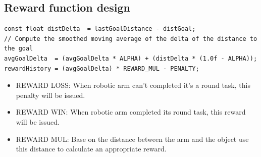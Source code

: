 \documentclass[10pt,journal,compsoc]{IEEEtran}
\begin{document}
\subsection{Reward function design}

\begin{lstlisting}
const float distDelta  = lastGoalDistance - distGoal;
// Compute the smoothed moving average of the delta of the distance to the goal
avgGoalDelta  = (avgGoalDelta * ALPHA) + (distDelta * (1.0f - ALPHA));
rewardHistory = (avgGoalDelta) * REWARD_MUL - PENALTY;
\end{lstlisting}

\begin{itemize}
\item REWARD LOSS: When robotic arm can't completed it's a round task, this penalty will be issued.
\item REWARD WIN: When robotic arm completed its round task, this reward will be issued.
\item REWARD MUL: Base on the distance between the arm and the object use this distance to calculate an appropriate reward.
\end {itemize}
\end{document}

